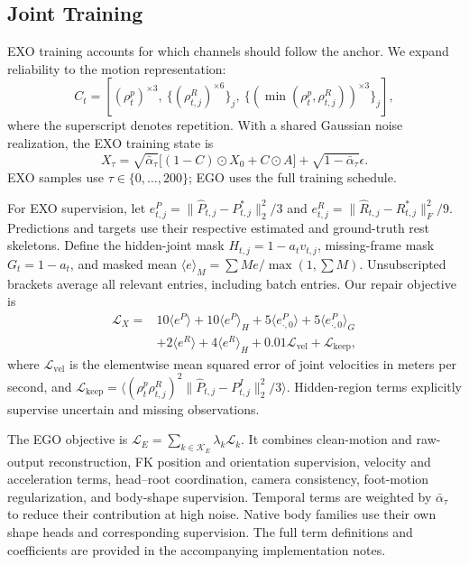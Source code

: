 \subsection{Joint Training}
\label{sec:training}

EXO training accounts for which channels should follow the anchor. We expand reliability to the motion representation:
\begin{equation}
C_t=\left[
(\rho^p_t)^{\times3},\
\{(\rho^R_{t,j})^{\times6}\}_{j},\
\{(\min(\rho^p_t,\rho^R_{t,j}))^{\times3}\}_{j}
\right],
\label{eq:reliability}
\end{equation}
where the superscript denotes repetition. With a shared Gaussian noise realization, the EXO training state is
\begin{equation}
X_\tau=
\sqrt{\bar\alpha_\tau}\big[(1-C)\odot X_0+C\odot A\big]
+\sqrt{1-\bar\alpha_\tau}\epsilon .
\label{eq:exo_training}
\end{equation}
EXO samples use $\tau\in\{0,\ldots,200\}$; EGO uses the full training schedule.

For EXO supervision, let $e^P_{t,j}=\|\widehat P_{t,j}-P^*_{t,j}\|_2^2/3$ and $e^R_{t,j}=\|\widehat R_{t,j}-R^*_{t,j}\|_F^2/9$. Predictions and targets use their respective estimated and ground-truth rest skeletons. Define the hidden-joint mask $H_{t,j}=1-a_tv_{t,j}$, missing-frame mask $G_t=1-a_t$, and masked mean $\langle e\rangle_M=\sum Me/\max(1,\sum M)$. Unsubscripted brackets average all relevant entries, including batch entries. Our repair objective is
\begin{equation}
\begin{aligned}
\mathcal L_X={}&
10\langle e^P\rangle+10\langle e^P\rangle_H
+5\langle e^P_{\cdot,0}\rangle
+5\langle e^P_{\cdot,0}\rangle_G\\
&+2\langle e^R\rangle+4\langle e^R\rangle_H
+0.01\mathcal L_{\mathrm{vel}}+\mathcal L_{\mathrm{keep}},
\end{aligned}
\label{eq:exo_loss}
\end{equation}
where $\mathcal L_{\mathrm{vel}}$ is the elementwise mean squared error of joint velocities in meters per second, and
$\mathcal L_{\mathrm{keep}}=
\langle(\rho^p_t\rho^R_{t,j})^2
\|\widehat P_{t,j}-P^I_{t,j}\|_2^2/3\rangle$.
Hidden-region terms explicitly supervise uncertain and missing observations.

The EGO objective is $\mathcal L_E=\sum_{k\in\mathcal K_E}\lambda_k\mathcal L_k$. It combines clean-motion and raw-output reconstruction, FK position and orientation supervision, velocity and acceleration terms, head--root coordination, camera consistency, foot-motion regularization, and body-shape supervision. Temporal terms are weighted by $\bar\alpha_\tau$ to reduce their contribution at high noise. Native body families use their own shape heads and corresponding supervision. The full term definitions and coefficients are provided in the accompanying implementation notes.

